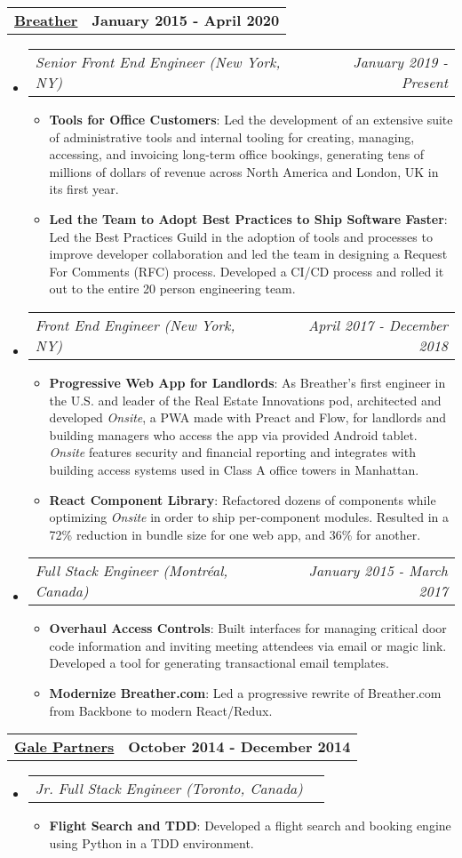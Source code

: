 \documentclass[letterpaper,10.8pt]{article}
\makeatletter
\newcommand{\resumeItem}[2]{
  \item\small{
    \textbf{#1}{: #2 \vspace{-2pt}}
  }
}
\newcommand{\jobLineItem}[2]{
  \vspace{0pt}\item[]
    \begin{tabular*}{0.98\textwidth}{l@{\extracolsep{\fill}}r}
      \textit{#1} & \textit{\small #2} \\
    \end{tabular*}\vspace{-4pt}
}
\newcommand{\employerTitle}[3]{
  \begin{tabular*}{1\textwidth}{l@{\extracolsep{\fill}}r}
    \href{#1}{\textbf{#2}} & \textbf{#3} \\
  \end{tabular*}\vspace{-4pt}
}
\newcommand{\resumeSubHeadingListStart}{\begin{itemize}[leftmargin=*]}
\newcommand{\resumeSubHeadingListEnd}{\end{itemize}}
\newcommand{\resumeItemListStart}{\begin{itemize}}
\newcommand{\resumeItemListEnd}{\end{itemize}\vspace{-5pt}}
\makeatother
\begin{document}
  \employerTitle
    {https://breather.com}{Breather}{January 2015 - April 2020}
  \resumeSubHeadingListStart
    \jobLineItem
        {Senior Front End Engineer (New York, NY)}{January 2019 - Present}
    \resumeItemListStart
        \resumeItem{Tools for Office Customers}
        {Led the development of an extensive suite of administrative tools and internal tooling for creating, managing, accessing, and invoicing long-term office bookings, generating tens of millions of dollars of revenue across North America and London, UK in its first year.}
        \resumeItem{Led the Team to Adopt Best Practices to Ship Software Faster}
        {Led the Best Practices Guild in the adoption of tools and processes to improve developer collaboration and led the team in designing a Request For Comments (RFC) process. Developed a CI/CD process and rolled it out to the entire 20 person engineering team.}
    \resumeItemListEnd
    \jobLineItem
        {Front End Engineer (New York, NY)}{April 2017 - December 2018}
    \resumeItemListStart
        \resumeItem{Progressive Web App for Landlords}
        {As Breather’s first engineer in the U.S. and leader of the Real Estate Innovations pod, architected and developed \textit{Onsite}, a PWA made with Preact and Flow, for landlords and building managers who access the app via provided Android tablet. \textit{Onsite} features security and financial reporting and integrates with building access systems used in Class A office towers in Manhattan.}
        \resumeItem{React Component Library}
        {Refactored dozens of components while optimizing \textit{Onsite} in order to ship per-component modules. Resulted in a 72\% reduction in bundle size for one web app, and 36\% for another.}
      \resumeItemListEnd
    \jobLineItem
		    {Full Stack Engineer (Montréal, Canada)}{January 2015 - March 2017}
		\resumeItemListStart
        \resumeItem{Overhaul Access Controls}
        {Built interfaces for managing critical door code information and inviting meeting attendees via email or magic link. Developed a tool for generating transactional email templates.}
        \resumeItem{Modernize Breather.com}
        {Led a progressive rewrite of Breather.com from Backbone to modern React/Redux.}
    \resumeItemListEnd
    \resumeSubHeadingListEnd

  \employerTitle
  {https://gale.agency}{Gale Partners}{October 2014 - December 2014}
  \resumeSubHeadingListStart
  \jobLineItem
		{Jr. Full Stack Engineer (Toronto, Canada)}{}
		\resumeItemListStart
      \resumeItem{Flight Search and TDD}
        {Developed a flight search and booking engine using Python in a TDD environment.}
      \resumeItemListEnd
    \resumeSubHeadingListEnd
\end{document}
